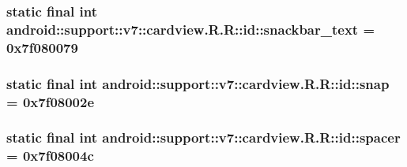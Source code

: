 \hypertarget{classandroid_1_1support_1_1v7_1_1cardview_1_1_r_1_1id_8dbbf02749754351ae3da5c5dfca9dde}{
\subsubsection[{snackbar\_\-text}]{\setlength{\rightskip}{0pt plus 5cm}static final int android::support::v7::cardview.R.R::id::snackbar\_\-text = 0x7f080079}}
\label{classandroid_1_1support_1_1v7_1_1cardview_1_1_r_1_1id_8dbbf02749754351ae3da5c5dfca9dde}


\hypertarget{classandroid_1_1support_1_1v7_1_1cardview_1_1_r_1_1id_9c56e76a573c7a7fd3d8618eecb17983}{
\subsubsection[{snap}]{\setlength{\rightskip}{0pt plus 5cm}static final int android::support::v7::cardview.R.R::id::snap = 0x7f08002e}}
\label{classandroid_1_1support_1_1v7_1_1cardview_1_1_r_1_1id_9c56e76a573c7a7fd3d8618eecb17983}


\hypertarget{classandroid_1_1support_1_1v7_1_1cardview_1_1_r_1_1id_67532e9803a10f8cd46fad6b434d510c}{
\subsubsection[{spacer}]{\setlength{\rightskip}{0pt plus 5cm}static final int android::support::v7::cardview.R.R::id::spacer = 0x7f08004c}}
\label{classandroid_1_1support_1_1v7_1_1cardview_1_1_r_1_1id_67532e9803a10f8cd46fad6b434d510c}


